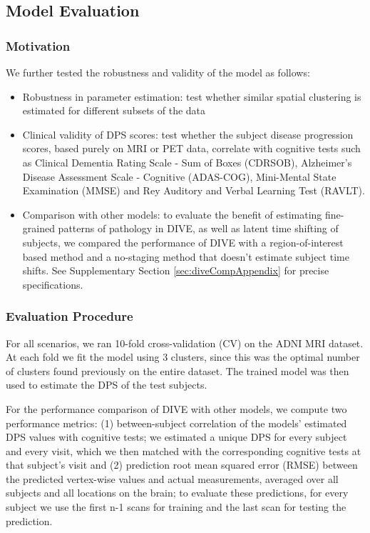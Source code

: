 \subsection{Model Evaluation}
\label{sec:diveEval}

\subsubsection{Motivation}
\label{sec:diveEvalMotiv}

We further tested the robustness and validity of the model as follows: 
\begin{itemize}
 \item Robustness in parameter estimation: test whether similar spatial clustering is estimated for different subsets of the data
 \item Clinical validity of DPS scores: test whether the subject disease progression scores, based purely on MRI or PET data, correlate with cognitive tests such as Clinical Dementia Rating Scale - Sum of Boxes (CDRSOB), Alzheimer's Disease Assessment Scale - Cognitive (ADAS-COG), Mini-Mental State Examination (MMSE) and Rey Auditory and Verbal Learning Test (RAVLT).
 \item Comparison with other models: to evaluate the benefit of estimating fine-grained patterns of pathology in DIVE, as well as latent time shifting of subjects, we compared the performance of DIVE with a region-of-interest based method \cite{jedynak2012computational} and a no-staging method that doesn't estimate subject time shifts. See Supplementary Section \ref{sec:diveCompAppendix} for precise specifications.
\end{itemize}


\subsubsection{Evaluation Procedure}

For all scenarios, we ran 10-fold cross-validation (CV) on the ADNI MRI dataset. At each fold we fit the model using 3 clusters, since this was the optimal number of clusters found previously on the entire dataset. The trained model was then used to estimate the DPS of the test subjects. 

For the performance comparison of DIVE with other models, we compute two performance metrics: (1) between-subject correlation of the models' estimated DPS values with cognitive tests; we estimated a unique DPS for every subject and every visit, which we then matched with the corresponding cognitive tests at that subject's visit and (2) prediction root mean squared error (RMSE) between the predicted vertex-wise values and actual measurements, averaged over all subjects and all locations on the brain; to evaluate these predictions, for every subject we use the first n-1 scans for training and the last scan for testing the prediction.



